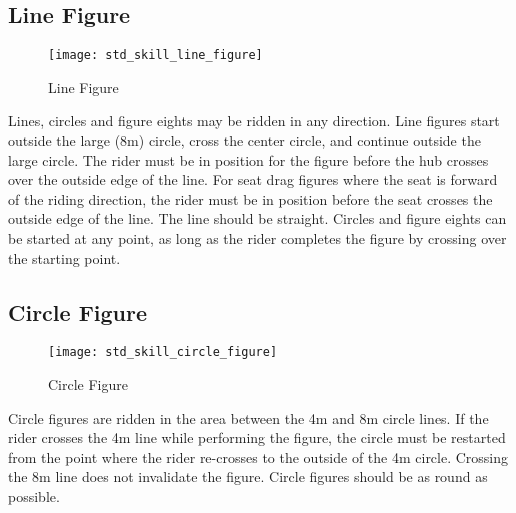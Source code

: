 \subsection{Line Figure}
\begin{wrapfigure}{r}{0.35\textwidth}
\vspace{-35pt}
\begin{center}
\texttt{[image: std\_skill\_line\_figure]}
\end{center}
\vspace{-20pt}
\caption{Line Figure\label{fig:std_skill_line_figure}}
\vspace{-10pt}
\end{wrapfigure}
Lines, circles and figure eights may be ridden in any direction.
Line figures start outside the large (8m) circle, cross the center circle, and continue outside the large circle.
The rider must be in position for the figure before the hub crosses over the outside edge of the line.
For seat drag figures where the seat is forward of the riding direction, the rider must be in position before the seat crosses the outside edge of the line.
The line should be straight.
Circles and figure eights can be started at any point, as long as the rider completes the figure by crossing over the starting point.

\subsection{Circle Figure}
\begin{wrapfigure}{r}{0.35\textwidth}
\vspace{-75pt}
\begin{center}
\texttt{[image: std\_skill\_circle\_figure]}
\end{center}
\vspace{-20pt}
\caption{Circle Figure\label{fig:std_skill_circle_figure}}
\vspace{-10pt}
\end{wrapfigure}
Circle figures are ridden in the area between the 4m and 8m circle lines.
If the rider crosses the 4m line while performing the figure, the circle must be restarted from the point where the rider re-crosses to the outside of the 4m circle.
Crossing the 8m line does not invalidate the figure.
Circle figures should be as round as possible.

